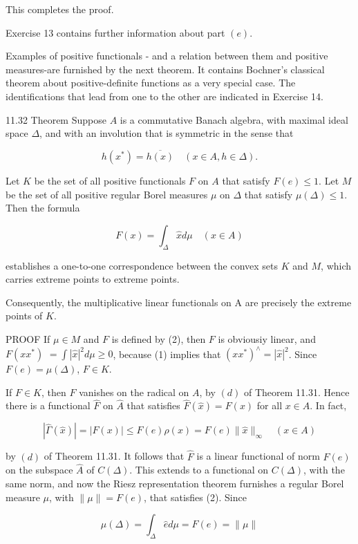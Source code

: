 \documentclass[10pt]{article}
\begin{document}
This completes the proof.

Exercise 13 contains further information about part $(e)$.

Examples of positive functionals - and a relation between them and positive measures-are furnished by the next theorem. It contains Bochner's classical theorem about positive-definite functions as a very special case. The identifications that lead from one to the other are indicated in Exercise 14.

11.32 Theorem Suppose $A$ is a commutative Banach algebra, with maximal ideal space $\Delta$, and with an involution that is symmetric in the sense that

$$
h\left(x^{*}\right)=\overline{h(x)} \quad(x \in A, h \in \Delta) .
$$

Let $K$ be the set of all positive functionals $F$ on $A$ that satisfy $F(e) \leq 1$. Let $M$ be the set of all positive regular Borel measures $\mu$ on $\Delta$ that satisfy $\mu(\Delta) \leq 1$. Then the formula

$$
F(x)=\int_{\Delta} \hat{x} d \mu \quad(x \in A)
$$

establishes a one-to-one correspondence between the convex sets $K$ and $M$, which carries extreme points to extreme points.

Consequently, the multiplicative linear functionals on A are precisely the extreme points of $K$.

PROOF If $\mu \in M$ and $F$ is defined by (2), then $F$ is obviousiy linear, and $F\left(x x^{*}\right)$ $=\int|\hat{x}|^{2} d \mu \geq 0$, because (1) implies that $\left(x x^{*}\right)^{\wedge}=|\hat{x}|^{2}$. Since $F(e)=\mu(\Delta)$, $F \in K$.

If $F \in K$, then $F$ vanishes on the radical on $A$, by $(d)$ of Theorem 11.31. Hence there is a functional $\hat{F}$ on $\hat{A}$ that satisfies $\hat{F}(\hat{x})=F(x)$ for all $x \in A$. In fact,

$$
|\hat{\Gamma}(\hat{x})|=|F(x)| \leq F(e) \rho(x)=F(e)\|\hat{x}\|_{\infty} \quad(x \in A)
$$

by $(d)$ of Theorem 11.31. It follows that $\hat{F}$ is a linear functional of norm $F(e)$ on the subspace $\hat{A}$ of $C(\Delta)$. This extends to a functional on $C(\Delta)$, with the same norm, and now the Riesz representation theorem furnishes a regular Borel measure $\mu$, with $\|\mu\|=F(e)$, that satisfies (2). Since

$$
\mu(\Delta)=\int_{\Delta} \hat{e} d \mu=F(e)=\|\mu\|
$$
\end{document}
